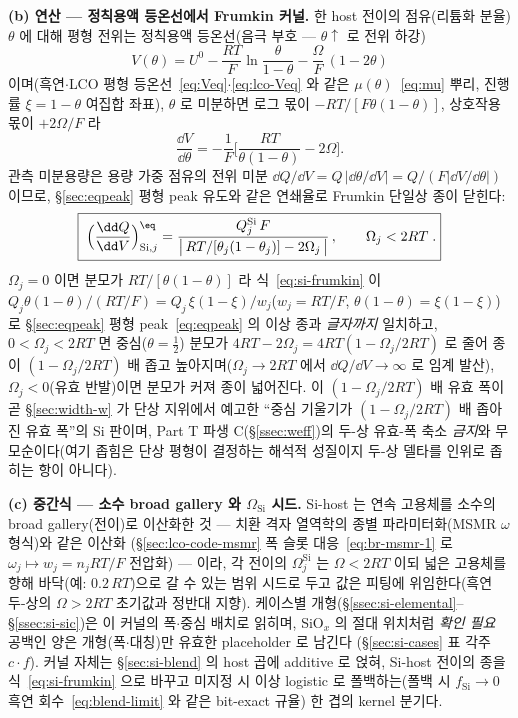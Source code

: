 \textbf{(b) 연산 --- 정칙용액 등온선에서 Frumkin 커널.} 한 host 전이의 점유(리튬화 분율) $\theta$ 에 대해 평형
전위는 정칙용액 등온선(음극 부호 --- $\theta\!\uparrow$ 로 전위 하강)
\begin{equation}
V(\theta)=U^0-\frac{RT}{F}\ln\frac{\theta}{1-\theta}-\frac{\Omega}{F}\,(1-2\theta)
\label{eq:si-frumkin-V}
\end{equation}
이며(흑연$\cdot$LCO 평형 등온선~\eqref{eq:Veq}$\cdot$\eqref{eq:lco-Veq} 와 같은 $\mu(\theta)$~\eqref{eq:mu} 뿌리, 진행률
$\xi\!=\!1\!-\!\theta$ 여집합 좌표), $\theta$ 로 미분하면 로그 몫이 $-RT/[F\theta(1-\theta)]$, 상호작용 몫이
$+2\Omega/F$ 라
\[
\frac{\dd V}{\dd\theta}=-\frac1F\Big[\frac{RT}{\theta(1-\theta)}-2\Omega\Big].
\]
관측 미분용량은 용량 가중 점유의 전위 미분 $\dd Q/\dd V=Q\,|\dd\theta/\dd V|=Q/(F|\dd V/\dd\theta|)$ 이므로,
\S\ref{sec:eqpeak} 평형 peak 유도와 같은 연쇄율로 Frumkin 단일상 종이 닫힌다:
\begin{equation}
\boxed{\;\Big(\frac{\dd Q}{\dd V}\Big)^{\eq}_{\mathrm{Si},j}
=\frac{Q_j^\mathrm{Si}\,F}{\big|\,RT/[\theta_j(1-\theta_j)]-2\Omega_j\,\big|}\,,
\qquad \Omega_j<2RT\;.}
\label{eq:si-frumkin}
\end{equation}
$\Omega_j\!=\!0$ 이면 분모가 $RT/[\theta(1-\theta)]$ 라 식~\eqref{eq:si-frumkin} 이
$Q_j\theta(1-\theta)/(RT/F)=Q_j\,\xi(1-\xi)/w_j$($w_j\!=\!RT/F$, $\theta(1-\theta)\!=\!\xi(1-\xi)$)로 \S\ref{sec:eqpeak}
평형 peak~\eqref{eq:eqpeak} 의 이상 종과 \emph{글자까지} 일치하고, $0\!<\!\Omega_j\!<\!2RT$ 면 중심($\theta\!=\!\tfrac12$)
분모가 $4RT-2\Omega_j=4RT(1-\Omega_j/2RT)$ 로 줄어 종이 $(1-\Omega_j/2RT)$ 배 좁고 높아지며($\Omega_j\!\to\!2RT$
에서 $\dd Q/\dd V\!\to\!\infty$ 로 임계 발산), $\Omega_j\!<\!0$(유효 반발)이면 분모가 커져 종이 넓어진다. 이
$(1-\Omega_j/2RT)$ 배 유효 폭이 곧 \S\ref{sec:width-w} 가 단상 지위에서 예고한 ``중심 기울기가
$(1-\Omega_j/2RT)$ 배 좁아진 유효 폭''의 Si 판이며, Part T 파생 C(\S\ref{ssec:weff})의 두-상 유효-폭 축소
\emph{금지}와 무모순이다(여기 좁힘은 단상 평형이 결정하는 해석적 성질이지 두-상 델타를 인위로 좁히는 항이 아니다).

\textbf{(c) 중간식 --- 소수 broad gallery 와 $\Omega_\mathrm{Si}$ 시드.} Si-host 는 연속 고용체를 소수의 broad
gallery(전이)로 이산화한 것 --- 치환 격자 열역학의 종별 파라미터화(MSMR $\omega$ 형식)와 같은 이산화\cite{msmr_origin2017}
(\S\ref{sec:lco-code-msmr} 폭 슬롯 대응~\eqref{eq:br-msmr-1} 로 $\omega_j\!\mapsto\!w_j\!=\!n_jRT/F$ 전압화) ---
이라, 각 전이의 $\Omega_j^\mathrm{Si}$ 는 $\Omega\!<\!2RT$ 이되 넓은 고용체를 향해
바닥(예: $0.2\,RT$)으로 갈 수 있는 범위 시드로 두고 값은 피팅에 위임한다(흑연 두-상의 $\Omega\!>\!2RT$ 초기값과
정반대 지향). 케이스별 개형(\S\ref{ssec:si-elemental}--\S\ref{ssec:si-sic})은 이 커널의 폭$\cdot$중심 배치로
읽히며, SiO$_x$ 의 절대 위치처럼 \emph{확인 필요} 공백인 양은 개형(폭$\cdot$대칭)만 유효한 placeholder 로 남긴다
(\S\ref{sec:si-cases} 표 각주 $c\!\cdot\!f$). 커널 자체는 \S\ref{sec:si-blend} 의 host 곱에 additive 로 얹혀,
Si-host 전이의 종을 식~\eqref{eq:si-frumkin} 으로 바꾸고 미지정 시 이상 logistic 로 폴백하는(폴백 시
$f_\mathrm{Si}\!\to\!0$ 흑연 회수~\eqref{eq:blend-limit} 와 같은 bit-exact 규율) 한 겹의 kernel 분기다.

